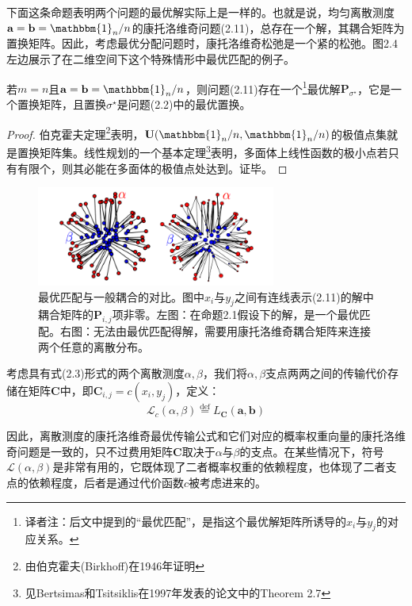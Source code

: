 \documentclass[cn,10pt,math=newtx,citestyle=gb7714-2015,bibstyle=gb7714-2015]{elegantbook}
\begin{document}
下面这条命题表明两个问题的最优解实际上是一样的。也就是说，均匀离散测度$\mathbf{a}=\mathbf{b}=\mathbbm{1}_n/n$的康托洛维奇问题(2.11)，总存在一个解，其耦合矩阵为置换矩阵。因此，考虑最优分配问题时，康托洛维奇松弛是一个紧的松弛。图2.4左边展示了在二维空间下这个特殊情形中最优匹配的例子。

\begin{proposition}[康托洛维奇匹配]
若$m=n$且$\mathbf{a}=\mathbf{b}=\mathbbm{1}_n/n$，则问题(2.11)存在一个\footnote{译者注：后文中提到的“最优匹配”，是指这个最优解矩阵所诱导的$x_i$与$y_j$的对应关系。}最优解$\mathbf{P}_{\sigma^\star}$，它是一个置换矩阵，且置换$\sigma^\star$是问题(2.2)中的最优置换。
\end{proposition}

\begin{proof}
伯克霍夫定理\footnote{由伯克霍夫(Birkhoff)在1946年证明}表明，$\mathbf{U}(\mathbbm{1}_n/n,\mathbbm{1}_n/n)$的极值点集就是置换矩阵集。线性规划的一个基本定理\footnote{见Bertsimas和Tsitsiklis在1997年发表的论文中的Theorem 2.7}表明，多面体上线性函数的极小点若只有有限个，则其必能在多面体的极值点处达到。证毕。
\end{proof}

\begin{figure}[H]
    \centering
    \includegraphics[width=0.7\textwidth]{figure/fig2.4.png}
    \caption{最优匹配与一般耦合的对比。图中$x_i$与$y_j$之间有连线表示(2.11)的解中耦合矩阵的$\mathbf{P}_{i,j}$项非零。左图：在命题2.1假设下的解，是一个最优匹配。右图：无法由最优匹配得解，需要用康托洛维奇耦合矩阵来连接两个任意的离散分布。}
    \label{图2.4}
\end{figure}

\begin{postulate}[离散测度的康托洛维奇问题]

考虑具有式(2.3)形式的两个离散测度$\alpha,\beta$，我们将$\alpha,\beta$支点两两之间的传输代价存储在矩阵$\mathbf{C}$中，即$\mathbf{C}_{i,j}=c(x_i,y_j)$，定义：
\begin{equation}
    \label{2.13}
    \mathcal{L}_c(\alpha,\beta)\overset{\text{def}}{=}L_\mathbf{C}(\mathbf{a,b})
\end{equation}

因此，离散测度的康托洛维奇最优传输公式和它们对应的概率权重向量的康托洛维奇问题是一致的，只不过费用矩阵$\mathbf{C}$取决于$\alpha$与$\beta$的支点。在某些情况下，符号$\mathcal{L}(\alpha,\beta)$是非常有用的，它既体现了二者概率权重的依赖程度，也体现了二者支点的依赖程度，后者是通过代价函数$c$被考虑进来的。

\end{postulate}
\end{document}
